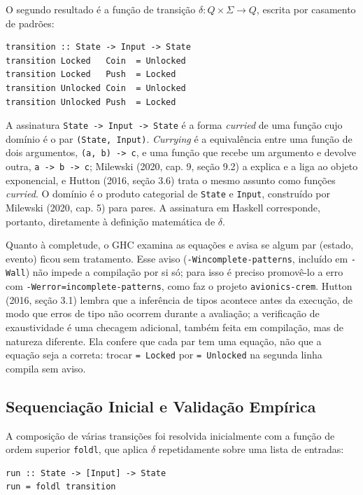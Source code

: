 \documentclass[12pt,a4paper]{article}
\begin{document}
O segundo resultado é a função de transição $\delta: Q \times \Sigma \to Q$, escrita por casamento de padrões:

\begin{verbatim}
transition :: State -> Input -> State
transition Locked   Coin  = Unlocked
transition Locked   Push  = Locked
transition Unlocked Coin  = Unlocked
transition Unlocked Push  = Locked
\end{verbatim}

A assinatura \texttt{State -> Input -> State} é a forma \textit{curried} de uma função cujo domínio é o par \texttt{(State, Input)}. \textit{Currying} é a equivalência entre uma função de dois argumentos, \texttt{(a, b) -> c}, e uma função que recebe um argumento e devolve outra, \texttt{a -> b -> c}; Milewski (2020, cap. 9, seção 9.2) a explica e a liga ao objeto exponencial, e Hutton (2016, seção 3.6) trata o mesmo assunto como funções \textit{curried}. O domínio é o produto categorial de \texttt{State} e \texttt{Input}, construído por Milewski (2020, cap. 5) para pares. A assinatura em Haskell corresponde, portanto, diretamente à definição matemática de $\delta$.

Quanto à completude, o GHC examina as equações e avisa se algum par (estado, evento) ficou sem tratamento. Esse aviso (\texttt{-Wincomplete-patterns}, incluído em \texttt{-Wall}) não impede a compilação por si só; para isso é preciso promovê-lo a erro com \texttt{-Werror=incomplete-patterns}, como faz o projeto \texttt{avionics-crem}. Hutton (2016, seção 3.1) lembra que a inferência de tipos acontece antes da execução, de modo que erros de tipo não ocorrem durante a avaliação; a verificação de exaustividade é uma checagem adicional, também feita em compilação, mas de natureza diferente. Ela confere que cada par tem uma equação, não que a equação seja a correta: trocar \texttt{= Locked} por \texttt{= Unlocked} na segunda linha compila sem aviso.

\subsection{Sequenciação Inicial e Validação Empírica}

A composição de várias transições foi resolvida inicialmente com a função de ordem superior \texttt{foldl}, que aplica $\delta$ repetidamente sobre uma lista de entradas:

\begin{verbatim}
run :: State -> [Input] -> State
run = foldl transition
\end{verbatim}
\end{document}
